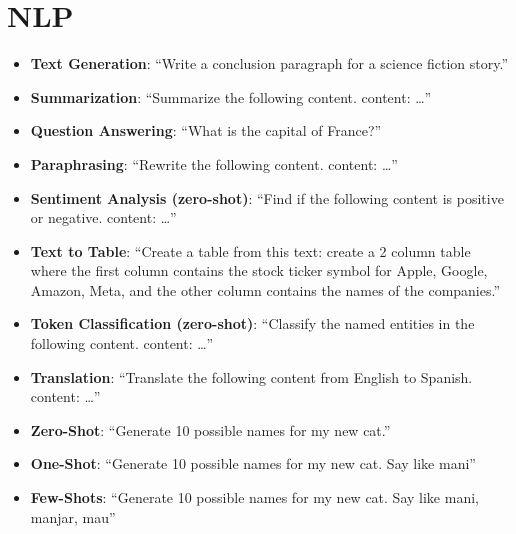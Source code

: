 \section{NLP}

\begin{itemize}
\itemsep-0.25em %
\item \textbf{Text Generation}: ``Write a conclusion paragraph for a science fiction story.''
\item \textbf{Summarization}: ``Summarize the following content. content: \ldots''
\item \textbf{Question Answering}: ``What is the capital of France?''
\item \textbf{Paraphrasing}: ``Rewrite the following content. content: \ldots''
\item \textbf{Sentiment Analysis (zero-shot)}: ``Find if the following content is positive or negative. content: \ldots''
\item \textbf{Text to Table}: ``Create a table from this text: create a 2 column table where the first column contains the stock ticker symbol for Apple, Google, Amazon, Meta, and the other column contains the names of the companies.''
\item \textbf{Token Classification (zero-shot)}: ``Classify the named entities in the following content. content: \ldots''
\item \textbf{Translation}: ``Translate the following content from English to Spanish. content: \ldots''
\item \textbf{Zero-Shot}: ``Generate 10 possible names for my new cat.''
\item \textbf{One-Shot}: ``Generate 10 possible names for my new cat. Say like mani''
\item \textbf{Few-Shots}: ``Generate 10 possible names for my new cat. Say like mani, manjar, mau''

\end{itemize}

